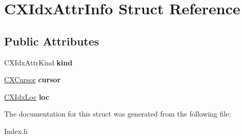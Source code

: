 \hypertarget{structCXIdxAttrInfo}{}\section{C\+X\+Idx\+Attr\+Info Struct Reference}
\label{structCXIdxAttrInfo}
\subsection*{Public Attributes}
\begin{DoxyCompactItemize}
\item 
\mbox{\label{structCXIdxAttrInfo_aaa76925630efb8ae625e1f1a5b7d2139}} 
C\+X\+Idx\+Attr\+Kind {\bfseries kind}
\item 
\mbox{\label{structCXIdxAttrInfo_aba55c7d6e320345cbcc4d79609c56ac8}} 
\mbox{\hyperlink{structCXCursor}{C\+X\+Cursor}} {\bfseries cursor}
\item 
\mbox{\label{structCXIdxAttrInfo_a45905974b9a71d31ee7edfb9becb4c1c}} 
\mbox{\hyperlink{structCXIdxLoc}{C\+X\+Idx\+Loc}} {\bfseries loc}
\end{DoxyCompactItemize}


The documentation for this struct was generated from the following file\+:\begin{DoxyCompactItemize}
\item 
Index.\+h\end{DoxyCompactItemize}
